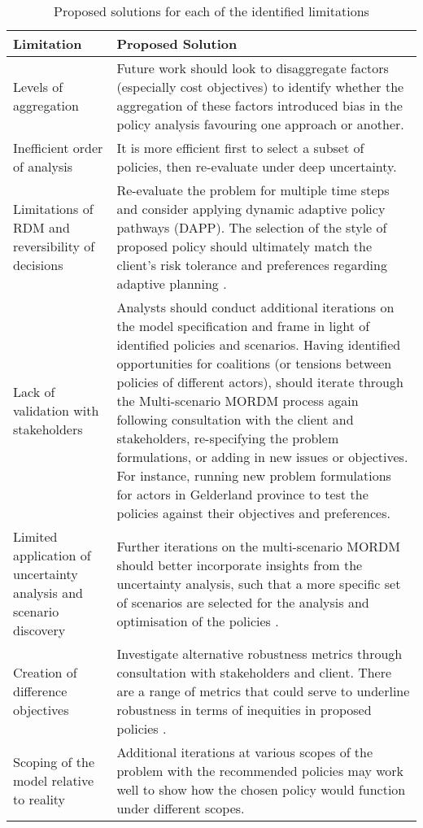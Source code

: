 \begin{table}[h]
\caption{Proposed solutions for each of the identified limitations}
\label{tab:Proposed Solutions}
\centering
\begin{tabular}{p{}|p{}}
\textbf{Limitation} & \textbf{Proposed Solution}  \\ \hline
Levels of aggregation & Future work should look to disaggregate factors (especially cost objectives) to identify whether the aggregation of these factors introduced bias in the policy analysis favouring one approach or another. \\ \hline
Inefficient order of analysis &  It is more efficient first to select a subset of policies, then re-evaluate under deep uncertainty.\\ \hline
Limitations of RDM and reversibility of decisions & Re-evaluate the problem for multiple time steps and consider applying dynamic adaptive policy pathways (DAPP). The selection of the style of proposed policy should ultimately match the client's risk tolerance and preferences regarding adaptive planning \parencite{marchau_decision_2019}. \\ \hline
Lack of validation with stakeholders &Analysts should conduct additional iterations on the model specification and frame in light of identified policies and scenarios. Having identified opportunities for coalitions (or tensions between policies of different actors), should iterate through the Multi-scenario MORDM process again following consultation with the client and stakeholders, re-specifying the problem formulations, or adding in new issues or objectives. For instance, running new problem formulations for actors in Gelderland province to test the policies against their objectives and preferences. \\ \hline
Limited application of uncertainty analysis and scenario discovery & Further iterations on the multi-scenario MORDM should better incorporate insights from the uncertainty analysis, such that a more specific set of scenarios are selected for the analysis and optimisation of the policies \parencite{watson_incorporating_2017, eker_including_2018}. \\ \hline
Creation of difference objectives & Investigate alternative robustness metrics through consultation with stakeholders and client. There are a range of metrics that could serve to underline robustness in terms of inequities in proposed policies \parencite{mcphail_robustness_2018}. \\ \hline
Scoping of the model relative to reality & Additional iterations at various scopes of the problem with the recommended policies may work well to show how the chosen policy would function under different scopes.        \\ \hline

\end{tabular}
\end{table}
